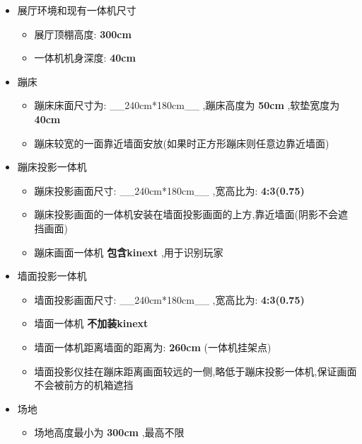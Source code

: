 \documentclass[11pt]{article}
\providecommand{\tightlist}{%
      \setlength{\itemsep}{0pt}\setlength{\parskip}{0pt}}
\begin{document}
    \begin{itemize}
\tightlist
\item
  展厅环境和现有一体机尺寸

  \begin{itemize}
  \tightlist
  \item
    展厅顶棚高度: \textbf{300cm}
  \item
    一体机机身深度: \textbf{40cm}
  \end{itemize}
\item
  蹦床

  \begin{itemize}
  \tightlist
  \item
    蹦床床面尺寸为: \_\_240cm*180cm\_\_ ,蹦床高度为 \textbf{50cm}
    ,软垫宽度为 \textbf{40cm}
  \item
    蹦床较宽的一面靠近墙面安放(如果时正方形蹦床则任意边靠近墙面)
  \end{itemize}
\item
  蹦床投影一体机

  \begin{itemize}
  \tightlist
  \item
    蹦床投影画面尺寸: \_\_240cm*180cm\_\_ ,宽高比为: \textbf{4:3(0.75)}
  \item
    蹦床投影画面的一体机安装在墙面投影画面的上方,靠近墙面(阴影不会遮挡画面)
  \item
    蹦床画面一体机 \textbf{包含kinext} ,用于识别玩家
  \end{itemize}
\item
  墙面投影一体机

  \begin{itemize}
  \tightlist
  \item
    墙面投影画面尺寸: \_\_240cm*180cm\_\_ ,宽高比为: \textbf{4:3(0.75)}
  \item
    墙面一体机 \textbf{不加装kinext}
  \item
    墙面一体机距离墙面的距离为: \textbf{260cm} (一体机挂架点)
  \item
    墙面投影仪挂在蹦床距离画面较远的一侧,略低于蹦床投影一体机,保证画面不会被前方的机箱遮挡
  \end{itemize}
\item
  场地

  \begin{itemize}
  \tightlist
  \item
    场地高度最小为 \textbf{300cm} ,最高不限
  \end{itemize}
\end{itemize}
\end{document}
